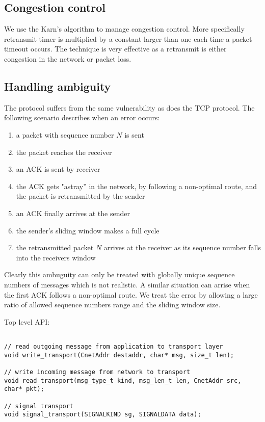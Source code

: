 \documentclass[11pt,a4paper,oneside]{report}
\begin{document}
\subsection{Congestion control}
We use the Karn's algorithm to manage congestion control. More specifically
retransmit timer is multiplied by a constant larger than one each time a packet
timeout occurs. The technique is very effective as a retransmit is either
congestion in the network or packet loss. \\
\subsection{Handling ambiguity}
The protocol suffers from the same vulnerability as does the TCP protocol. 
The following scenario describes when an error occurs:
\begin{enumerate}
\item a packet with sequence number $N$ is sent
\item the packet reaches the receiver
\item an ACK is sent by receiver
\item the ACK gets "astray'' in the network, by following a non-optimal route, and the packet is retransmitted by the sender
\item an ACK finally arrives at the sender
\item the sender's sliding window makes a full cycle
\item the retransmitted packet $N$ arrives at the receiver as its sequence number falls into the receivers window
\end{enumerate}

Clearly this ambuguity can only be treated with globally unique sequence numbers
of messages which is not realistic. A similar situation can arrise when the
first ACK follows a non-optimal route. We treat the error by allowing a large
ratio of allowed sequence numbers range and the sliding window size.

    Top level API:  
 \begin{lstlisting}

// read outgoing message from application to transport layer
void write_transport(CnetAddr destaddr, char* msg, size_t len);

// write incoming message from network to transport
void read_transport(msg_type_t kind, msg_len_t len, CnetAddr src, char* pkt);

// signal transport
void signal_transport(SIGNALKIND sg, SIGNALDATA data);

  \end{lstlisting}
   
\end{document}
